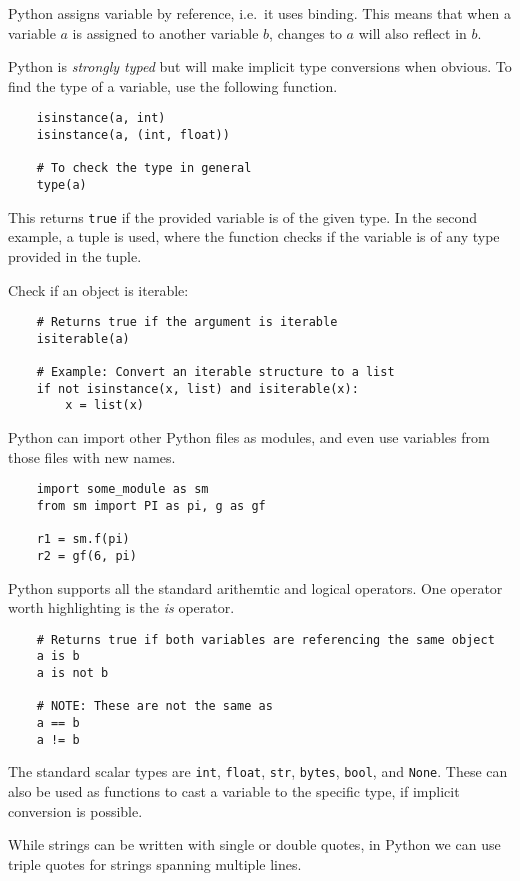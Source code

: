  Python assigns variable by reference, i.e.\ it uses binding. This means that when a variable \( a \) is assigned to another variable \( b \), changes to \( a \) will also reflect in \( b \).

 Python is \emph{strongly typed} but will make implicit type conversions when obvious. To find the type of a variable, use the following function.

 \begin{verbatim}
 	isinstance(a, int)
 	isinstance(a, (int, float))

 	# To check the type in general
 	type(a)
 \end{verbatim}
This returns \texttt{true} if the provided variable is of the given type. In the second example, a tuple is used, where the function checks if the variable is of any type provided in the tuple.

Check if an object is iterable:
 \begin{verbatim}
 	# Returns true if the argument is iterable
 	isiterable(a)

 	# Example: Convert an iterable structure to a list
 	if not isinstance(x, list) and isiterable(x):
 		x = list(x)
 \end{verbatim}


Python can import other Python files as modules, and even use variables from those files with new names.
 \begin{verbatim}
	import some_module as sm
	from sm import PI as pi, g as gf

	r1 = sm.f(pi)
	r2 = gf(6, pi)
 \end{verbatim}

Python supports all the standard arithemtic and logical operators. One operator worth highlighting is the \emph{is} operator.

 \begin{verbatim}
 	# Returns true if both variables are referencing the same object
 	a is b
 	a is not b

 	# NOTE: These are not the same as
 	a == b
 	a != b
 \end{verbatim}

The standard scalar types are \texttt{int}, \texttt{float}, \texttt{str}, \texttt{bytes}, \texttt{bool}, and \texttt{None}. These can also be used as functions to cast a variable to the specific type, if implicit conversion is possible.

While strings can be written with single or double quotes, in Python we can use triple quotes for strings spanning multiple lines.

